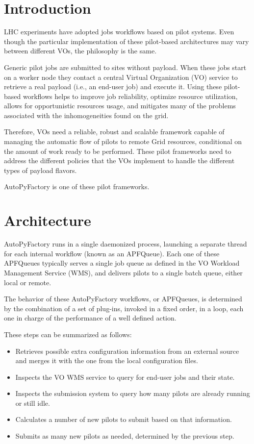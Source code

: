 \documentclass[a4paper]{jpconf}
\begin{document}
\section{Introduction}

LHC experiments have adopted jobs workflows based on pilot systems.
Even though the particular implementation of these pilot-based architectures may
vary between different VOs, the philosophy is the same. 

Generic pilot jobs are submitted to sites without payload. 
When these jobs start on a worker node they contact a central Virtual Organization (VO)
service to retrieve a real payload (i.e., an end-user job) and execute it.
Using these pilot-based workflows helps to improve job reliability,
optimize resource utilization, allows for opportunistic resources usage, 
and mitigates many of the problems associated with the inhomogeneities found on the grid.

Therefore, VOs need a reliable, robust and scalable
framework capable of managing the automatic flow of pilots to remote Grid
resources, conditional on the amount of work ready to be performed.
These pilot frameworks need to address the different policies that the VOs
implement to handle the different types of payload flavors.

AutoPyFactory is one of these pilot frameworks.


\section{Architecture}

AutoPyFactory runs in a single daemonized process,
launching a separate thread for each internal workflow (known as an APFQueue).
Each one of these APFQueues typically serves a single job queue 
as defined in the VO Workload Management Service (WMS), 
and delivers pilots to a single batch queue, either local or remote. 

The behavior of these AutoPyFactory workflows, or APFQueues,
is determined by the combination of a set of plug-ins, 
invoked in a fixed order, in a loop, each one in charge of the performance of a well defined action.

These steps can be summarized as follows:
\begin{itemize}
    \item Retrieves possible extra configuration information from an external source 
          and merges it with the one from the local configuration files.
    \item Inspects the VO WMS service to query for end-user jobs and their state.
    \item Inspects the submission system to query how many pilots are already running or still idle.
    \item Calculates a number of new pilots to submit based on that information.
    \item Submits as many new pilots as needed, determined by the previous step.
\end{itemize}
\end{document}
